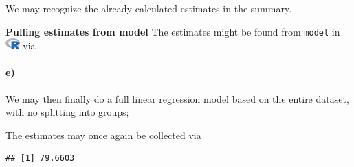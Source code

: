 \documentclass[
]{article}
\newenvironment{Shaded}{\begin{snugshade}}{\end{snugshade}}
\newcommand{\DecValTok}[1]{\textcolor[rgb]{0.00,0.00,0.81}{#1}}
\newcommand{\KeywordTok}[1]{\textcolor[rgb]{0.13,0.29,0.53}{\textbf{#1}}}
\newcommand{\NormalTok}[1]{#1}
\newcommand{\OperatorTok}[1]{\textcolor[rgb]{0.81,0.36,0.00}{\textbf{#1}}}
\newcommand{\StringTok}[1]{\textcolor[rgb]{0.31,0.60,0.02}{#1}}
\begin{document}
We may recognize the already calculated estimates in the summary.

\textbf{Pulling estimates from model} The estimates might be found from
\texttt{model} in
\includegraphics[width=\textwidth,height=0.16667in]{R_logo.png} via

\begin{Shaded}
\end{Shaded}

\hypertarget{e}{%
\paragraph{\texorpdfstring{\textbf{e)}}{e)}}\label{e}}

We may then finally do a full linear regression model based on the
entire dataset, with no splitting into groups;

\begin{Shaded}
\end{Shaded}

The estimates may once again be collected via

\begin{Shaded}
\end{Shaded}

\begin{verbatim}
## [1] 79.6603
\end{verbatim}
\end{document}
